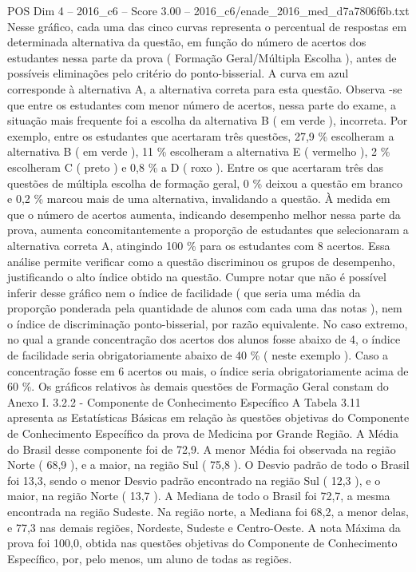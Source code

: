 \begin{textsample}{POS Dim 4 – 2016\_c6 – Score 3.00 – 2016\_c6/enade\_2016\_med\_d7a7806f6b.txt}
Nesse gráfico, cada uma das cinco curvas representa o percentual de respostas em determinada alternativa da questão, em função do número de acertos dos estudantes nessa parte da prova ( Formação Geral/Múltipla Escolha ), antes de possíveis eliminações pelo critério do ponto-bisserial.
A curva em azul corresponde à alternativa A, a alternativa correta para esta questão.
Observa -se que entre os estudantes com menor número de acertos, nessa parte do exame, a situação mais frequente foi a escolha da alternativa B ( em verde ), incorreta.
Por exemplo, entre os estudantes que acertaram três questões, 27,9 \% escolheram a alternativa B ( em verde ), 11 \% escolheram a alternativa E ( vermelho ), 2 \% escolheram C ( preto ) e 0,8 \% a D ( roxo ).
Entre os que acertaram três das questões de múltipla escolha de formação geral, 0 \% deixou a questão em branco e 0,2 \% marcou mais de uma alternativa, invalidando a questão.
À medida em que o número de acertos aumenta, indicando desempenho melhor nessa parte da prova, aumenta concomitantemente a proporção de estudantes que selecionaram a alternativa correta A, atingindo 100 \% para os estudantes com 8 acertos.
Essa análise permite verificar como a questão discriminou os grupos de desempenho, justificando o alto índice obtido na questão.
Cumpre notar que não é possível inferir desse gráfico nem o índice de facilidade ( que seria uma média da proporção ponderada pela quantidade de alunos com cada uma das notas ), nem o índice de discriminação ponto-bisserial, por razão equivalente.
No caso extremo, no qual a grande concentração dos acertos dos alunos fosse abaixo de 4, o índice de facilidade seria obrigatoriamente abaixo de 40 \% ( neste exemplo ).
Caso a concentração fosse em 6 acertos ou mais, o índice seria obrigatoriamente acima de 60 \%.
Os gráficos relativos às demais questões de Formação Geral constam do Anexo I. 3.2.2 - Componente de Conhecimento Específico A Tabela 3.11 apresenta as Estatísticas Básicas em relação às questões objetivas do Componente de Conhecimento Específico da prova de Medicina por Grande Região.
A Média do Brasil desse componente foi de 72,9.
A menor Média foi observada na região Norte ( 68,9 ), e a maior, na região Sul ( 75,8 ).
O Desvio padrão de todo o Brasil foi 13,3, sendo o menor Desvio padrão encontrado na região Sul ( 12,3 ), e o maior, na região Norte ( 13,7 ).
A Mediana de todo o Brasil foi 72,7, a mesma encontrada na região Sudeste.
Na região norte, a Mediana foi 68,2, a menor delas, e 77,3 nas demais regiões, Nordeste, Sudeste e Centro-Oeste.
A nota Máxima da prova foi 100,0, obtida nas questões objetivas do Componente de Conhecimento Específico, por, pelo menos, um aluno de todas as regiões.

\end{textsample}
